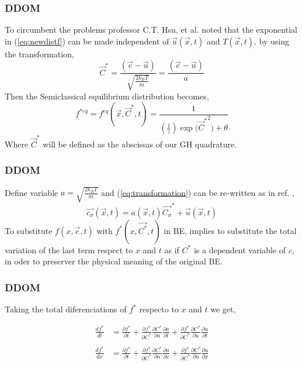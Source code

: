 \begin{frame}
	\frametitle{DDOM}
	To circumbent the problems professor C.T. Hsu, et al. \cite{Hsu201239} noted that the exponential in (\ref{eq:newdistf}) can be made independent of $\vec{u}(\vec{x},t)$ and $T(\vec{x},t)$. by using the transformation,
	\begin{equation}
	\vec{C}^{*}  = \frac{(\vec{c}-\vec{u})}{\sqrt{\frac{2 k_B T}{m}}} = \frac{(\vec{c}-\vec{u})}{a}
	\label{eq:transformation}
	\end{equation}
	Then the Semiclassical equilibrium distribution becomes,
	\begin{equation}
	f^{*eq} = f^{eq}(\vec{x},\vec{C}^{*},t) = \frac{1}{(\frac{1}{z})\exp{(\vec{C}^{*}}^2)+\theta}
	\label{eq:newdistf}
	\end{equation}
	Where $\vec{C}^{*}$ will be defined as the abscissas of our GH quadrature.
	
\end{frame}

\begin{frame}
	\frametitle{DDOM}
	Define variable $a = \sqrt{\frac{2 k_B T}{m}}$ and (\ref{eq:transformation}) can be re-written as in ref. \cite{Hsu201239},
	\begin{equation}
	\vec{c_\sigma}(\vec{x},t)  = a(\vec{x},t)\vec{C_\sigma}^{*}+\vec{u}(\vec{x},t) 
	\end{equation}
	To substitute $f(x,\vec{c},t)$ with $f^*(x,\vec{C^*},t)$ in BE, implies to substitute the total variation of the last term respect to $x$ and $t$ as if $C^*$ is a dependent variable of $c$, in oder to preserver the physical meaning of the original BE.
\end{frame}

\begin{frame}
	\frametitle{DDOM}
	Taking the total diferenciations of $f^*$ respecto to $x$ and $t$ we get,
			
	\begin{align*}
		\frac{df^*}{dt} &= \frac{\partial{f^*}}{\partial{t}} + 
				\frac{\partial{f^*}}{\partial{C^*}} \frac{\partial{C^*}}{\partial{a}} \frac{\partial{a}}{\partial{t}} + 
				\frac{\partial{f^*}}{\partial{C^*}} \frac{\partial{C^*}}{\partial{u}} \frac{\partial{u}}{\partial{t}}
		\\		
		\\ \frac{df^*}{dx} &= \frac{\partial{f^*}}{\partial{t}} + 
				\frac{\partial{f^*}}{\partial{C^*}} \frac{\partial{C^*}}{\partial{a}} \frac{\partial{a}}{\partial{x}} + 
				\frac{\partial{f^*}}{\partial{C^*}} \frac{\partial{C^*}}{\partial{u}} \frac{\partial{u}}{\partial{x}}
	\end{align*}
\end{frame}

